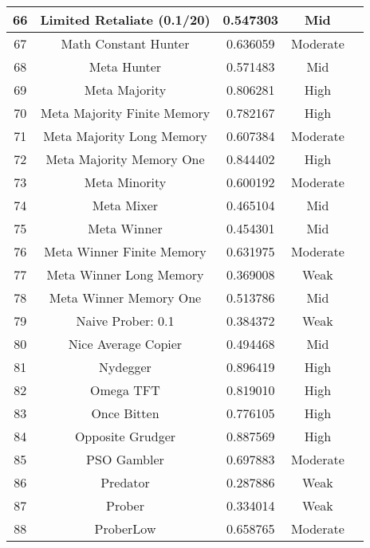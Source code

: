 \begin{longtable}{ccccc}
			66  & Limited Retaliate (0.1/20)  & 0.547303          & Mid     \\ \hline
			67  & Math Constant Hunter        & 0.636059          & Moderate \\ \hline
			68  & Meta Hunter                 & 0.571483          & Mid     \\ \hline
			69  & Meta Majority               & 0.806281          & High     \\ \hline
			70  & Meta Majority Finite Memory & 0.782167          & High     \\ \hline
			71  & Meta Majority Long Memory   & 0.607384          & Moderate \\ \hline
			72  & Meta Majority Memory One    & 0.844402          & High     \\ \hline
			73  & Meta Minority               & 0.600192          & Moderate \\ \hline
			74  & Meta Mixer                  & 0.465104          & Mid     \\ \hline
			75  & Meta Winner                 & 0.454301          & Mid     \\ \hline
			76  & Meta Winner Finite Memory   & 0.631975          & Moderate \\ \hline
			77  & Meta Winner Long Memory     & 0.369008          & Weak     \\ \hline
			78  & Meta Winner Memory One      & 0.513786          & Mid     \\ \hline
			79  & Naive Prober: 0.1           & 0.384372          & Weak     \\ \hline
			80  & Nice Average Copier         & 0.494468          & Mid     \\ \hline
			81  & Nydegger                    & 0.896419          & High     \\ \hline
			82  & Omega TFT                   & 0.819010          & High     \\ \hline
			83  & Once Bitten                 & 0.776105          & High     \\ \hline
			84  & Opposite Grudger            & 0.887569          & High     \\ \hline
			85  & PSO Gambler                 & 0.697883          & Moderate \\ \hline
			86  & Predator                    & 0.287886          & Weak     \\ \hline
			87  & Prober                      & 0.334014          & Weak     \\ \hline
			88  & ProberLow                   & 0.658765          & Moderate \\ \hline

\end{longtable}
